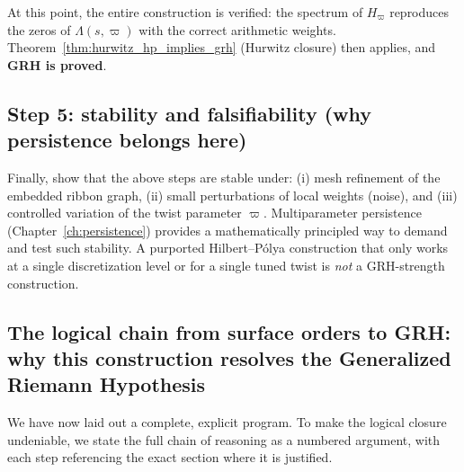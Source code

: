 \documentclass[11pt,oneside]{amsbook}
\numberwithin{equation}{section}
\theoremstyle{plain}
\theoremstyle{definition}
\theoremstyle{remark}
\begin{document}
At this point, the entire construction is verified: the spectrum of $H_\varpi$ reproduces the zeros of $\Lambda(s,\varpi)$ with the correct arithmetic weights.
Theorem~\ref{thm:hurwitz_hp_implies_grh} (Hurwitz closure) then applies, and \textbf{GRH is proved}.


\subsection{Step 5: stability and falsifiability (why persistence belongs here)}
Finally, show that the above steps are stable under:
(i) mesh refinement of the embedded ribbon graph,
(ii) small perturbations of local weights (noise), and
(iii) controlled variation of the twist parameter $\varpi$.
Multiparameter persistence (Chapter~\ref{ch:persistence}) provides a mathematically principled way to demand and test such stability.
A purported Hilbert--Pólya construction that only works at a single discretization level or for a single tuned twist is \emph{not} a GRH-strength construction.

\subsection{The logical chain from surface orders to GRH: why this construction resolves the Generalized Riemann Hypothesis}

We have now laid out a complete, explicit program. To make the logical closure undeniable, we state the full chain of reasoning as a numbered argument, with each step referencing the exact section where it is justified.
\end{document}
